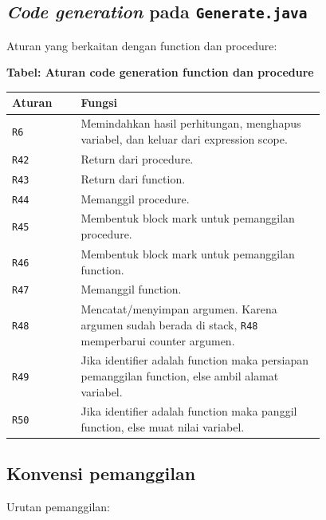 \documentclass[11pt,a4paper]{article}
\begin{document}
\subsection{\textit{Code generation} pada \texttt{Generate.java}}

Aturan yang berkaitan dengan function dan procedure:

\begin{center}
\textbf{Tabel: Aturan code generation function dan procedure} \\[6pt]
\begin{tabular}{@{} l p{0.78\linewidth} @{}}
\hline
\textbf{Aturan} & \textbf{Fungsi} \\
\hline
\texttt{R6}  & Memindahkan hasil perhitungan, menghapus variabel, dan keluar dari expression scope. \\
\texttt{R42} & Return dari procedure. \\
\texttt{R43} & Return dari function. \\
\texttt{R44} & Memanggil procedure. \\
\texttt{R45} & Membentuk block mark untuk pemanggilan procedure. \\
\texttt{R46} & Membentuk block mark untuk pemanggilan function. \\
\texttt{R47} & Memanggil function. \\
\texttt{R48} & Mencatat/menyimpan argumen. Karena argumen sudah berada di stack, \texttt{R48} memperbarui counter argumen. \\
\texttt{R49} & Jika identifier adalah function maka persiapan pemanggilan function, else ambil alamat variabel. \\
\texttt{R50} & Jika identifier adalah function maka panggil function, else muat nilai variabel. \\
\hline
\end{tabular}
\end{center}



\subsection{Konvensi pemanggilan}

Urutan pemanggilan:
\end{document}
